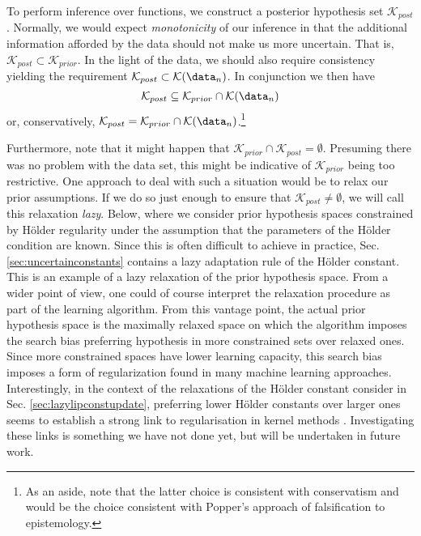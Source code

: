 To perform inference over functions, we construct a posterior hypothesis set $\mathcal K_{post}$. 
Normally, we would expect \textit{monotonicity} of our inference in that the additional information afforded by the data should not make us more uncertain. That is,  $\mathcal K_{post} \subset \mathcal K_{prior}$. In the light of the data, we should 
also require consistency yielding the requirement $\mathcal K_{post} \subset \mathcal K(\data_n)$. In conjunction we then have 
\begin{equation}
	\mathcal K_{post} \subseteq \mathcal K_{prior} \cap \mathcal K(\data_n)
\end{equation} or, conservatively, 
$\mathcal K_{post} = \mathcal K_{prior} \cap \mathcal K(\data_n)$.\footnote{As an aside, note that the latter choice is consistent with conservatism and would be the choice consistent with Popper's approach of falsification to epistemology.}

\begin{rem}
\label{rem:lazyrelaxationpriorspace}
Furthermore, note that it might happen that $\mathcal K_{prior} \cap \mathcal K_{post} =\emptyset$. Presuming there was no problem with the data set, this might be indicative of $\mathcal K_{prior}$ being too restrictive. One approach to deal with such a situation would be to relax our prior assumptions. If we do so just enough to ensure that $\mathcal K_{post} \neq \emptyset$, we will call this relaxation \emph{lazy}. Below, where we consider prior hypothesis spaces constrained by H\"older regularity under the assumption that the parameters of the H\"older condition are known. Since this is often difficult to achieve in practice, Sec. \ref{sec:uncertainconstants} contains a lazy adaptation rule of the H\"older constant. This is an example of a lazy relaxation of the prior hypothesis space. 
From a wider point of view, one could of course interpret the relaxation procedure as part of the learning algorithm. From this vantage point, the actual prior hypothesis space is the maximally relaxed space on which the algorithm imposes the search bias \cite{mitchellbook:97} preferring hypothesis in more constrained sets over relaxed ones. Since more constrained spaces have lower learning capacity, this search bias imposes a form of regularization found in many machine learning approaches. Interestingly, in the context of the relaxations of the H\"older constant consider in Sec. \ref{sec:lazylipconstupdate}, preferring lower H\"older constants over larger ones seems to establish a strong link to regularisation in kernel methods \cite{wahabarepresenter:1990}. Investigating these links is something we have not done yet, but will be undertaken in future work. 
\end{rem}

